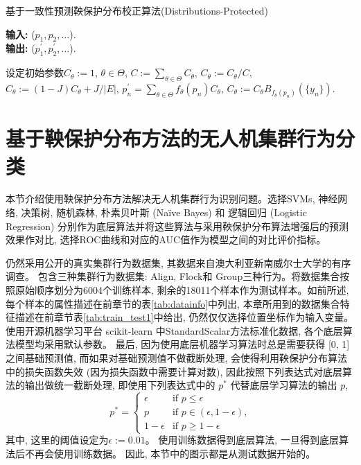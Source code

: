 \begin{algorithm}[!htbp]
    \small
    \caption{基于一致性预测鞅保护分布校正算法(Distributions-Protected)}
    \label{alg:protect}
    \hspace*{\algorithmicindent} \textbf{输入:} {($p_{1}, p_{2}, \ldots$).}\\
    \hspace*{\algorithmicindent} \textbf{输出:} {($p_{1}^{\prime}, p_{2}^{\prime}, \ldots$).}    
    \begin{algorithmic}[1]
        \State 设定初始参数$C_{\theta} := 1$, $\theta \in \Theta$,
        \State $C := \sum_{\theta \in \Theta}^{}C_{\theta}$,
        \For{$\theta \in \Theta$}
        \State $C_{\theta} := C_{\theta}/C$,
        \EndFor
        \For{$\theta \in \Theta$}
        \State $C_{\theta} := (1 - J)C_{\theta} + J/|E|$,
        \EndFor
        \State $p_{n}^{\prime} = \sum_{\theta \in \Theta}^{}f_{\theta}(p_{n})C_{\theta}$,
        \EndFor
        \For{$\theta \in \Theta$}
        \State $C_{\theta} := C_{\theta} B_{f_{\theta}(p_{n})}(\{y_{n}\})$.
        \EndFor
        \EndProcedure
    \end{algorithmic}
\end{algorithm}


\section{基于鞅保护分布方法的无人机集群行为分类}
\label{experimental}
本节介绍使用鞅保护分布方法解决无人机集群行为识别问题。选择SVMs, 神经网络, 决策树, 随机森林, 朴素贝叶斯 (Na\"{i}ve Bayes) 和 逻辑回归 (Logistic Regression) 分别作为底层算法并将这些算法与采用鞅保护分布算法增强后的预测效果作对比, 选择ROC曲线和对应的AUC值作为模型之间的对比评价指标。

仍然采用公开的真实集群行为数据集, 其数据来自澳大利亚新南威尔士大学的有序调查。 包含三种集群行为数据集: Align, Flock和 Group三种行为。将数据集合按照原始顺序划分为6004个训练样本, 剩余的18011个样本作为测试样本。如前所述, 每个样本的属性描述在前章节的表\ref{tab:datainfo}中列出, 本章所用到的数据集合特征描述在前章节表\ref{tab:train_test1}中给出, 仍然仅仅选择位置坐标作为输入变量。 使用开源机器学习平台 scikit-learn 中StandardScalar方法标准化数据, 各个底层算法模型均采用默认参数。 最后, 因为使用底层机器学习算法时总是需要获得 [0, 1] 之间基础预测值, 而如果对基础预测值不做截断处理, 会使得利用鞅保护分布算法中的损失函数失效 (因为损失函数中需要计算对数), 因此按照下列表达式对底层算法的输出做统一截断处理, 即使用下列表达式中的 $p^{*}$ 代替底层学习算法的输出 $p$,
\begin{equation}
  p^{*} =
    \begin{cases}
      \epsilon & \text{if $p \leq \epsilon$}\\
      p & \text{if $p \in (\epsilon, 1-\epsilon)$,}\\
      1-\epsilon & \text{if $p \geq 1-\epsilon$}
    \end{cases}       
\end{equation}
其中, 这里的阈值设定为$\epsilon := 0.01$。 使用训练数据得到底层算法, 一旦得到底层算法后不再会使用训练数据。 因此, 本节中的图示都是从测试数据开始的。

